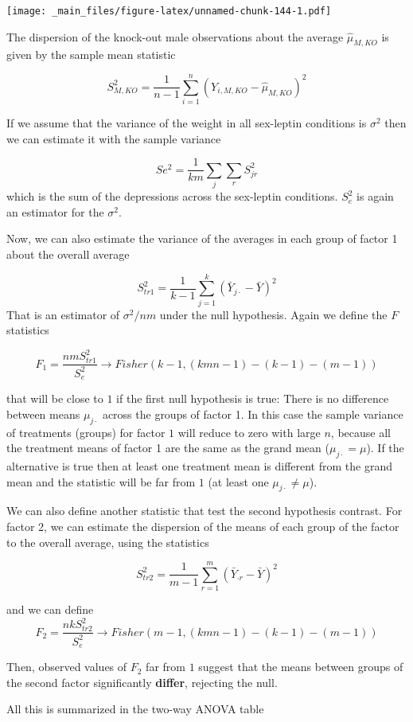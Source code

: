 \documentclass[
]{book}
\begin{document}
\texttt{[image: \_main\_files/figure-latex/unnamed-chunk-144-1.pdf]}

The dispersion of the knock-out male observations about the average \(\hat{\mu}_{M,KO}\) is given by the sample mean statistic

\[S^2_{M,KO}=\frac{1}{n-1}\sum_{i=1}^n (Y_{i,M,KO}-\hat{\mu}_{M,KO})^2\]

If we assume that the variance of the weight in all sex-leptin conditions is \(\sigma^2\) then we can estimate it with the sample variance

\[Se^2= \frac{1}{km}\sum_j \sum_r S^2_{jr}\]
which is the sum of the depressions across the sex-leptin conditions. \(S_e^2\) is again an estimator for the \(\sigma^2\).

Now, we can also estimate the variance of the averages in each group of factor 1 about the overall average

\[S^2_{tr1}=\frac{1}{k-1} \sum_{j=1}^k(\bar{Y}_{j\cdot}-\bar{Y})^2\]
That is an estimator of \(\sigma^2/nm\) under the null hypothesis. Again we define the \(F\) statistics

\[F_1=\frac{nmS_{tr1}^2}{S_{e}^2} \rightarrow Fisher(k-1,(kmn-1)-(k-1)-(m-1))\]

that will be close to \(1\) if the first null hypothesis is true: There is no difference between means \(\mu_{j\cdot}\) across the groups of factor 1. In this case the sample variance of treatments (groups) for factor \(1\) will reduce to zero with large \(n\), because all the treatment means of factor 1 are the same as the grand mean (\(\mu_{j\cdot}=\mu\)). If the alternative is true then at least one treatment mean is different from the grand mean and the statistic will be far from \(1\) (at least one \(\mu_{j\cdot}\neq\mu\)).

We can also define another statistic that test the second hypothesis contrast. For factor 2, we can estimate the dispersion of the means of each group of the factor to the overall average, using the statistics

\[S^2_{tr2}=\frac{1}{m-1} \sum_{r=1}^m(\bar{Y}_{\cdot r}-\bar{Y})^2\]

and we can define \[F_2=\frac{nkS_{tr2}^2}{S_{e}^2}\rightarrow Fisher(m-1,(kmn-1)-(k-1)-(m-1))\]

Then, observed values of \(F_2\) far from \(1\) suggest that the means between groups of the second factor significantly \textbf{differ}, rejecting the null.

All this is summarized in the two-way ANOVA table
\end{document}
